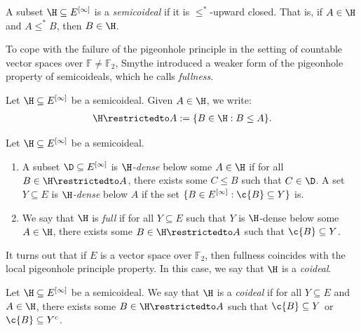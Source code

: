\documentclass[11pt,reqno]{amsart}
\begin{document}
\begin{definition}
\label{def:semicoideal}
    A subset $\H \subseteq E^{[\infty]}$ is a \emph{semicoideal} if it is $\leq^*$-upward closed. That is, if $A \in \H$ and $A \leq^* B$, then $B \in \H$.
\end{definition}

To cope with the failure of the pigeonhole principle in the setting of countable vector spaces over $\mathbb{F} \neq \mathbb{F}_2$, Smythe introduced a weaker form of the pigeonhole property of semicoideals, which he calls \emph{fullness}.

\begin{notation}
    Let $\H \subseteq E^{[\infty]}$ be a semicoideal. Given $A \in \H$, we write:
    \begin{align*}
        \H\restrictedto A := \{B \in \H : B \leq A\}.
    \end{align*}
\end{notation}

\begin{definition}
\label{def:full.semicoideal}
    Let $\H \subseteq E^{[\infty]}$ be a semicoideal.
    \begin{enumerate}
        \item A subset $\D \subseteq E^{[\infty]}$ is \emph{$\H$-dense} below some $A \in \H$ if for all $B \in \H\restrictedto A$, there exists some $C \leq B$ such that $C \in \D$. A set $Y \subseteq E$ is \emph{$\H$-dense} below $A$ if the set $\{B \in E^{[\infty]} : \c{B} \subseteq Y\}$ is.

        \item We say that $\H$ is \emph{full} if for all $Y \subseteq E$ such that $Y$ is $\H$-dense below some $A \in \H$, there exists some $B \in \H\restrictedto A$ such that $\c{B} \subseteq Y$.
    \end{enumerate}
\end{definition}

It turns out that if $E$ is a vector space over $\mathbb{F}_2$, then fullness coincides with the local pigeonhole principle property. In this case, we say that $\H$ is a \emph{coideal}.

\begin{definition}
\label{def:coideal.vector.spaces}
    Let $\H \subseteq E^{[\infty]}$ be a semicoideal. We say that $\H$ is a \emph{coideal} if for all $Y \subseteq E$ and $A \in \H$, there exists some $B \in \H\restrictedto A$ such that $\c{B} \subseteq Y$ or $\c{B} \subseteq Y^c$.
\end{definition}
\end{document}
